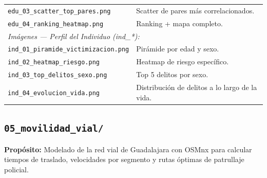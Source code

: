 \documentclass[12pt, a4paper]{article}
\begin{document}
\begin{table}[h!]
\begin{tabular}{p{6cm} p{8cm}}
\texttt{edu\_03\_scatter\_top\_pares.png} & Scatter de pares más correlacionados. \\
\texttt{edu\_04\_ranking\_heatmap.png} & Ranking + mapa completo. \\
\midrule
\multicolumn{2}{l}{\textit{Imágenes --- Perfil del Individuo (ind\_*):}} \\
\addlinespace
\texttt{ind\_01\_piramide\_victimizacion.png} & Pirámide por edad y sexo. \\
\texttt{ind\_02\_heatmap\_riesgo.png} & Heatmap de riesgo específico. \\
\texttt{ind\_03\_top\_delitos\_sexo.png} & Top 5 delitos por sexo. \\
\texttt{ind\_04\_evolucion\_vida.png} & Distribución de delitos a lo largo de la vida. \\
\bottomrule
\end{tabular}
\end{table}

\subsection{\texttt{05\_movilidad\_vial/}}

\textbf{Propósito:} Modelado de la red vial de Guadalajara con OSMnx para calcular tiempos de traslado, velocidades por segmento y rutas óptimas de patrullaje policial.
\end{document}
